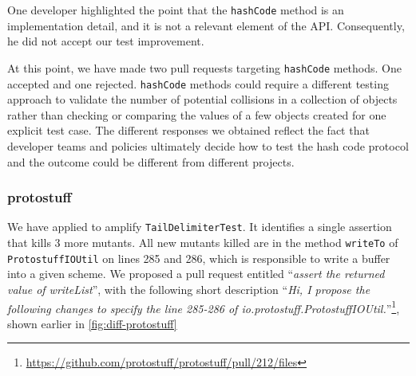 One developer highlighted the point that the \texttt{hashCode} method is an implementation detail, and it is not a relevant element of the API. Consequently, he did not accept our test improvement.

At this point, we have made two pull requests targeting \texttt{hashCode} methods. One accepted and one rejected. \texttt{hashCode} methods could require a different testing approach to validate the number of potential collisions in a collection of objects rather than checking or comparing the values of a few objects created for one explicit test case. The different responses we obtained reflect the fact that developer teams and policies ultimately decide how to test the hash code protocol and the outcome could be different from different projects.



\subsubsection{protostuff}

We have applied \dspot to amplify \texttt{TailDelimiterTest}. It identifies a single assertion that kills 3 more mutants.
All new mutants killed are in the method \texttt{writeTo} of \texttt{ProtostuffIOUtil} on lines 285 and 286, which is responsible to write a buffer into a given scheme. We proposed a pull request entitled ``\emph{assert the returned value of writeList}'', with the following short description ``\emph{Hi, I propose the following changes to specify the line 285-286 of io.protostuff.ProtostuffIOUtil.}''\footnote{\url{https://github.com/protostuff/protostuff/pull/212/files}}, shown earlier in \autoref{fig:diff-protostuff}

